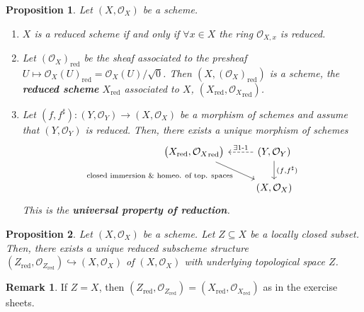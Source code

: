 \documentclass[12pt]{article}
\newtheorem*{proposition}{Proposition}
\theoremstyle{definition}
\newtheorem*{remark}{Remark}
\begin{document}
\begin{proposition}
Let $(X,\mathcal{O}_X)$ be a scheme.

\begin{enumerate}[label=\arabic*)]
\item $X$ is a reduced scheme if and only if $\forall x\in X$ the ring $\mathcal{O}_{X,x}$ is reduced.

\item Let $(\mathcal{O}_X)_{\text{red}}$ be the sheaf associated to the presheaf $U\mapsto\mathcal{O}_X(U)_{\text{red}}=\mathcal{O}_X(U)/\sqrt{0}$. Then $(X,(\mathcal{O}_X)_{\text{red}})$ is a scheme, the \textbf{reduced scheme} $X_{\text{red}}$ associated to $X$, $(X_{\text{red}},{\mathcal{O}_X}_{\text{red}})$.

\item Let $(f,f^{\sharp}):(Y,\mathcal{O}_Y)\rightarrow(X,\mathcal{O}_X)$ be a morphism of schemes and assume that $(Y,\mathcal{O}_Y)$ is reduced. Then, there exists a unique morphism of schemes
\[
\begin{tikzcd}
\big(X_{\text{red}},{\mathcal{O}_X}_{\text{red}}\big)\arrow[rd,"\text{closed immersion \& homeo. of top. spaces}",swap]&(Y,\mathcal{O}_Y)\arrow[l,dashed,"\exists1\text{-}1",swap]\arrow[d,"(f{,}f^{\sharp})"]\\
&(X,\mathcal{O}_X)
\end{tikzcd}
\]
This is the \textbf{universal property of reduction}.
\end{enumerate}
\end{proposition}

\begin{proposition}
Let $(X,\mathcal{O}_X)$ be a scheme. Let $Z\subseteq X$ be a locally closed subset. Then, there exists a unique reduced subscheme structure $(Z_{\text{red}},\mathcal{O}_{Z_{\text{red}}})\hookrightarrow(X,\mathcal{O}_X)$ of $(X,\mathcal{O}_X)$ with underlying topological space $Z$.
\end{proposition}

\begin{remark}
If $Z=X$, then $(Z_{\text{red}},\mathcal{O}_{Z_{\text{red}}})=(X_{\text{red}},\mathcal{O}_{X_{\text{red}}})$ as in the exercise sheets.
\end{remark}
\end{document}
